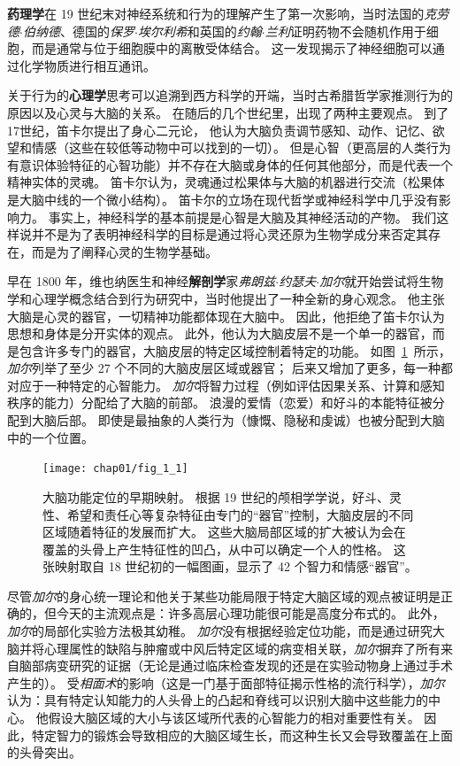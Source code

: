 \textbf{药理学}在 19 世纪末对神经系统和行为的理解产生了第一次影响，当时法国的\textit{克劳德$\cdot$伯纳德}、德国的\textit{保罗$\cdot$埃尔利希}和英国的\textit{约翰$\cdot$兰利}证明药物不会随机作用于细胞，而是通常与位于细胞膜中的离散受体结合。
这一发现揭示了神经细胞可以通过化学物质进行相互通讯。


关于行为的\textbf{心理学}思考可以追溯到西方科学的开端，当时古希腊哲学家推测行为的原因以及心灵与大脑的关系。
在随后的几个世纪里，出现了两种主要观点。
到了17世纪，笛卡尔提出了身心二元论，
他认为大脑负责调节感知、动作、记忆、欲望和情感（这些在较低等动物中可以找到的一切）。
但是心智（更高层的人类行为有意识体验特征的心智功能）并不存在大脑或身体的任何其他部分，而是代表一个精神实体的灵魂。
笛卡尔认为，灵魂通过松果体与大脑的机器进行交流（松果体是大脑中线的一个微小结构）。
笛卡尔的立场在现代哲学或神经科学中几乎没有影响力。
事实上，神经科学的基本前提是心智是大脑及其神经活动的产物。
我们这样说并不是为了表明神经科学的目标是通过将心灵还原为生物学成分来否定其存在，而是为了阐释心灵的生物学基础。


早在 1800 年，维也纳医生和神经\textbf{解剖学}家\textit{弗朗兹$\cdot$约瑟夫$\cdot$加尔}就开始尝试将生物学和心理学概念结合到行为研究中，当时他提出了一种全新的身心观念。
他主张大脑是心灵的器官，一切精神功能都体现在大脑中。
因此，他拒绝了笛卡尔认为思想和身体是分开实体的观点。
此外，他认为大脑皮层不是一个单一的器官，而是包含许多专门的器官，大脑皮层的特定区域控制着特定的功能。 
如图~\ref{fig:1_1}~所示，\textit{加尔}列举了至少 27 个不同的大脑皮层区域或器官； 
后来又增加了更多，每一种都对应于一种特定的心智能力。
\textit{加尔}将智力过程（例如评估因果关系、计算和感知秩序的能力）分配给了大脑的前部。
浪漫的爱情（恋爱）和好斗的本能特征被分配到大脑后部。
即使是最抽象的人类行为（慷慨、隐秘和虔诚）也被分配到大脑中的一个位置。


\begin{figure}[htbp]
	\centering
	\texttt{[image: chap01/fig\_1\_1]}
	\caption{大脑功能定位的早期映射。
		根据 19 世纪的颅相学学说，好斗、灵性、希望和责任心等复杂特征由专门的“器官”控制，大脑皮层的不同区域随着特征的发展而扩大。
		这些大脑局部区域的扩大被认为会在覆盖的头骨上产生特征性的凹凸，从中可以确定一个人的性格。
		这张映射取自 18 世纪初的一幅图画，显示了 42 个智力和情感“器官”。}
	\label{fig:1_1}
\end{figure}


尽管\textit{加尔}的身心统一理论和他关于某些功能局限于特定大脑区域的观点被证明是正确的，但今天的主流观点是：许多高层心理功能很可能是高度分布式的。
此外，\textit{加尔}的局部化实验方法极其幼稚。
\textit{加尔}没有根据经验定位功能，而是通过研究大脑并将心理属性的缺陷与肿瘤或中风后特定区域的病变相关联，\textit{加尔}摒弃了所有来自脑部病变研究的证据（无论是通过临床检查发现的还是在实验动物身上通过手术产生的）。
受\textit{相面术}的影响（这是一门基于面部特征揭示性格的流行科学），\textit{加尔}认为：具有特定认知能力的人头骨上的凸起和脊线可以识别大脑中这些能力的中心。
他假设大脑区域的大小与该区域所代表的心智能力的相对重要性有关。
因此，特定智力的锻炼会导致相应的大脑区域生长，而这种生长又会导致覆盖在上面的头骨突出。


